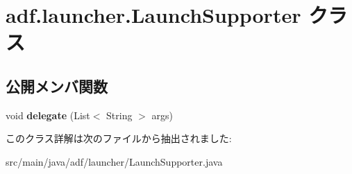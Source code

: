 \hypertarget{classadf_1_1launcher_1_1LaunchSupporter}{}\section{adf.\+launcher.\+Launch\+Supporter クラス}
\label{classadf_1_1launcher_1_1LaunchSupporter}
\subsection*{公開メンバ関数}
\begin{DoxyCompactItemize}
\item 
\hypertarget{classadf_1_1launcher_1_1LaunchSupporter_a5baa93a611aa5d8f70c9fa5f10504957}{}\label{classadf_1_1launcher_1_1LaunchSupporter_a5baa93a611aa5d8f70c9fa5f10504957} 
void {\bfseries delegate} (List$<$ String $>$ args)
\end{DoxyCompactItemize}


このクラス詳解は次のファイルから抽出されました\+:\begin{DoxyCompactItemize}
\item 
src/main/java/adf/launcher/Launch\+Supporter.\+java\end{DoxyCompactItemize}
